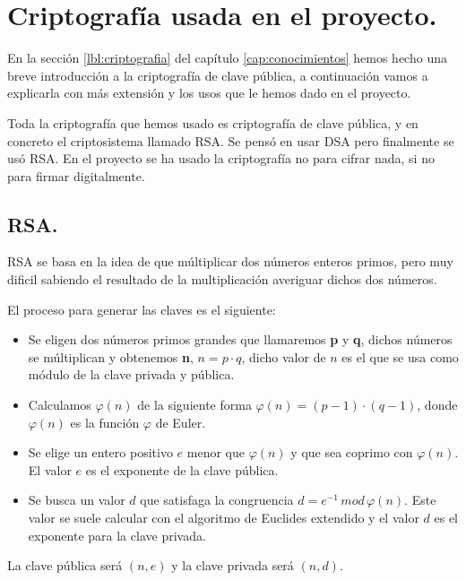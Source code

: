 \chapter{Criptografía usada en el proyecto.}

En la sección \ref{lbl:criptografia} del capítulo \ref{cap:conocimientos} hemos hecho una breve introducción a la criptografía de clave pública, a continuación vamos a explicarla con más extensión y los usos que le hemos dado en el proyecto.

Toda la criptografía que hemos usado es criptografía de clave pública, y en concreto el criptosistema llamado RSA. Se pensó en usar DSA pero finalmente se usó RSA. En el proyecto se ha usado la criptografía no para cifrar nada, si no para firmar digitalmente.

\section{RSA.}

RSA se basa en la idea de que múltiplicar dos números enteros primos, pero muy dificil sabiendo el resultado de la multiplicación averiguar dichos dos números.

El proceso para generar las claves es el siguiente:
\begin{itemize}

	\item Se eligen dos números primos grandes que llamaremos \textbf{p} y \textbf{q}, dichos números se múltiplican y obtenemos \textbf{n}, $n = p \cdot q$, dicho valor de $n$ es el que se usa como módulo de la clave privada y pública. 

	\item Calculamos $\varphi(n)$ de la siguiente forma $\varphi(n)=(p-1)\cdot(q-1)$, donde $\varphi(n)$ es la función $\varphi$ de Euler.

	\item Se elige un entero positivo $e$ menor que $\varphi(n)$ y que sea coprimo con $\varphi(n)$. El valor $e$ es el exponente de la clave pública.
	
	\item Se busca un valor $d$ que satisfaga la congruencia $d=e^{-1}\,mod\,\varphi(n)$. Este valor se suele calcular con el algoritmo de Euclides extendido y el valor $d$ es el exponente para la clave privada. 
\end{itemize}

La clave pública será $(n,e)$ y la clave privada será $(n,d)$.

